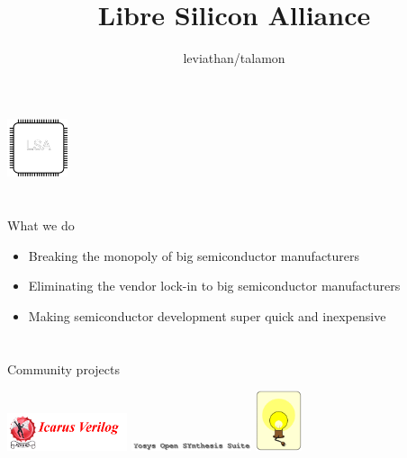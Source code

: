\documentclass[9pt]{beamer}
\author{leviathan/talamon}
\title{Libre Silicon Alliance}
\begin{document}
\begin{frame}
	\titlepage
	\begin{center}
		\includegraphics[width=50pt,height=50pt]{lsa.png}
	\end{center}
\end{frame}


\section[What]{}
\begin{frame}{What we do}
	\begin{itemize}
		\item Breaking the monopoly of big semiconductor manufacturers
		\item Eliminating the vendor lock-in to big semiconductor manufacturers
		\item Making semiconductor development super quick and inexpensive
	\end{itemize}
\end{frame}

\section[Who]{}
\begin{frame}{Community projects}
	\begin{center}
		\includegraphics[width=100pt]{Icarus.png}
		\includegraphics[width=100pt]{Yosys.png}
		\includegraphics[height=50pt]{Opencircuit.png}
	\end{center}
\end{frame}
\end{document}
